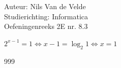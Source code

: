 \documentclass[a4paper]{article}
\begin{document}
  
\noindent \large Auteur: Nils Van de Velde \\
\noindent \large Studierichting: Informatica\\
\noindent \large Oefeningenreeks 2E nr. 8.3\\

\medskip

\normalsize

$2^{x-1} = 1 \Leftrightarrow x-1 = \log_2{1} \Leftrightarrow x = 1$\\

\begin{thebibliography}{999}
\end{thebibliography}
\end{document}
